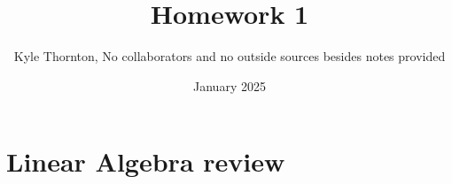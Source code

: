 \documentclass{article}
\title{Homework 1}
\author{Kyle Thornton, No collaborators and no outside sources besides notes provided}
\date{January 2025}
\begin{document}
\maketitle

\section{Linear Algebra review}
\end{document}
